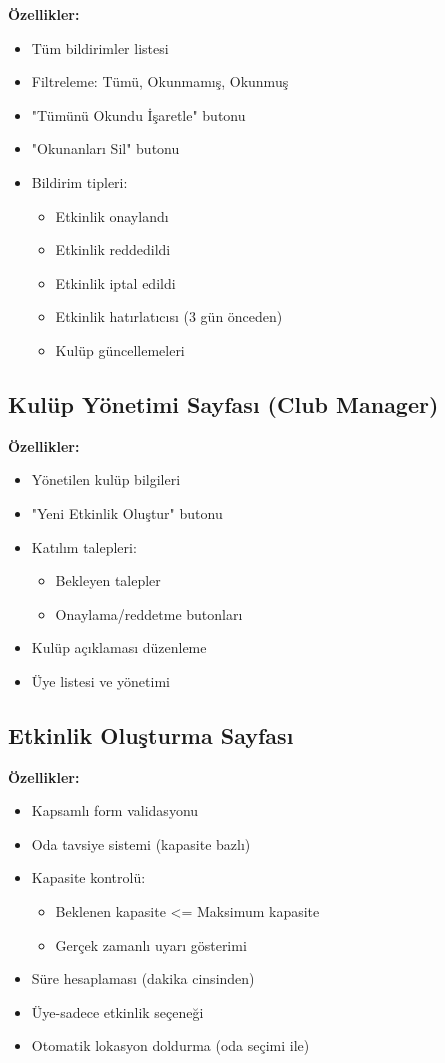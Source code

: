 \documentclass[a4paper,12pt]{report}
\begin{document}
\textbf{Özellikler:}
\begin{itemize}
    \item Tüm bildirimler listesi
    \item Filtreleme: Tümü, Okunmamış, Okunmuş
    \item "Tümünü Okundu İşaretle" butonu
    \item "Okunanları Sil" butonu
    \item Bildirim tipleri:
    \begin{itemize}
        \item Etkinlik onaylandı
        \item Etkinlik reddedildi
        \item Etkinlik iptal edildi
        \item Etkinlik hatırlatıcısı (3 gün önceden)
        \item Kulüp güncellemeleri
    \end{itemize}
\end{itemize}

\subsection{Kulüp Yönetimi Sayfası (Club Manager)}

\textbf{Özellikler:}
\begin{itemize}
    \item Yönetilen kulüp bilgileri
    \item "Yeni Etkinlik Oluştur" butonu
    \item Katılım talepleri:
    \begin{itemize}
        \item Bekleyen talepler
        \item Onaylama/reddetme butonları
    \end{itemize}
    \item Kulüp açıklaması düzenleme
    \item Üye listesi ve yönetimi
\end{itemize}

\subsection{Etkinlik Oluşturma Sayfası}

\textbf{Özellikler:}
\begin{itemize}
    \item Kapsamlı form validasyonu
    \item Oda tavsiye sistemi (kapasite bazlı)
    \item Kapasite kontrolü:
    \begin{itemize}
        \item Beklenen kapasite \textless= Maksimum kapasite
        \item Gerçek zamanlı uyarı gösterimi
    \end{itemize}
    \item Süre hesaplaması (dakika cinsinden)
    \item Üye-sadece etkinlik seçeneği
    \item Otomatik lokasyon doldurma (oda seçimi ile)
\end{itemize}
\end{document}
